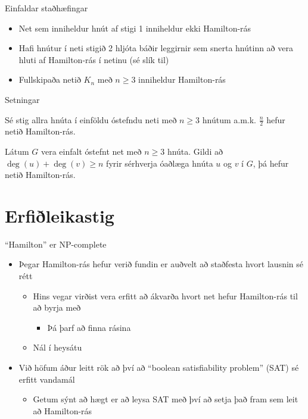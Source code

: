 \documentclass[handout]{beamer}
\begin{document}
\begin{frame}{Einfaldar staðhæfingar}
\begin{itemize}[<+->]
 \item Net sem inniheldur hnút af stigi 1 inniheldur ekki Hamilton-rás
 \item Hafi hnútur í neti stigið 2 hljóta báðir leggirnir sem snerta hnútinn að vera hluti af Hamilton-rás í netinu (sé slík til)
 \item Fullskipaða netið $K_n$ með $n \geq 3$ inniheldur Hamilton-rás
\end{itemize}
\end{frame}

\begin{frame}{Setningar}
    \begin{tcolorbox}[title=Setning Diracs]
        Sé stig allra hnúta í einföldu óstefndu neti með $n \geq 3$ hnútum a.m.k. $\frac{n}{2}$ hefur netið Hamilton-rás.
    \end{tcolorbox}
    \begin{tcolorbox}[title=Setning Ores]
        Látum $G$ vera einfalt óstefnt net með $n \geq 3$ hnúta. Gildi að $\deg(u) + \deg(v) \geq n$ fyrir sérhverja óaðlæga hnúta $u$ og $v$ í $G$, þá hefur netið Hamilton-rás.
    \end{tcolorbox}
\end{frame}

\section{Erfiðleikastig}

\begin{frame}{``Hamilton'' er NP-complete}
    \begin{itemize}
        \item Þegar Hamilton-rás hefur verið fundin er auðvelt að staðfesta hvort lausnin sé rétt
        \begin{itemize}
            \item Hins vegar virðist vera erfitt að ákvarða hvort net hefur Hamilton-rás til að byrja með
            \begin{itemize}
                \item Þá þarf að finna rásina
            \end{itemize}
            \item Nál í heysátu
        \end{itemize}
        \item Við höfum áður leitt rök að því að ``boolean satisfiability problem'' (SAT) sé erfitt vandamál
        \begin{itemize}
            \item Getum sýnt að hægt er að leysa SAT með því að setja það fram sem leit að Hamilton-rás
        \end{itemize}
    \end{itemize}
\end{frame}
\end{document}

